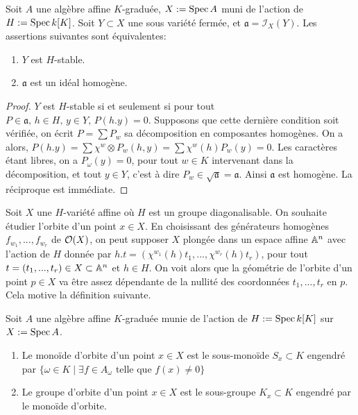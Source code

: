 \begin{prop}\label{stablehomogene}
Soit $A$ une algèbre affine $K$-graduée, $X:=\operatorname{Spec} A$ muni de l'action de $H:=\operatorname{Spec} k[K]$.  Soit $Y\subset X$ une sous variété fermée, et $\mathfrak{a}=\mathcal{I}_X(Y)$. Les assertions suivantes sont équivalentes:
\begin{enumerate}
\item $Y$ est $H$-stable.
\item $\mathfrak{a}$ est un idéal homogène.
\end{enumerate}
\end{prop}
\begin{proof}
$Y$ est $H$-stable si et seulement si pour tout $P\in \mathfrak{a},\,h\in H,\, y\in Y,\, P(h.y)=0$. Supposons que cette dernière condition soit vérifiée, on écrit $P=\sum P_w$ sa décomposition en composantes homogènes. On a alors, $P(h.y)=\sum \chi^w\otimes P_w(h,y) = \sum \chi^w(h) P_w(y)=0$. Les caractères étant libres, on a $P_{\omega}(y)=0$, pour tout $w\in K$ intervenant dans la décomposition, et tout $y\in Y$, c'est à dire $P_w\in \sqrt{\mathfrak{a}}=\mathfrak{a}$. Ainsi $\mathfrak{a}$ est homogène. La réciproque est immédiate. 
\end{proof}

Soit $X$ une $H$-variété affine où $H$ est un groupe diagonalisable. On souhaite étudier l'orbite d'un point $x\in X$. En choisissant des générateurs homogènes $f_{w_1},...,f_{w_r}$ de $\mathcal{O}(X)$, on peut supposer $X$ plongée dans un espace affine $\mathbb{A}^n$ avec l'action de $H$ donnée par $h.t=(\chi^{w_1}(h)t_1,...,\chi^{w_r}(h)t_r)$, pour tout $t=(t_1,...,t_r)\in X\subset \mathbb{A}^n$ et $h\in H$. On voit alors que la géométrie de l'orbite d'un point $p\in X$ va être assez dépendante de la nullité des coordonnées $t_1,..., t_r$ en $p$. Cela motive la définition suivante.

\begin{defn}
Soit $A$ une algèbre affine $K$-graduée munie de l'action de $H:=\operatorname{Spec} k[K]$ sur $X:=\operatorname{Spec} A$.
\begin{enumerate}
\item Le monoïde d'orbite d'un point $x\in X$ est le sous-monoïde $S_x\subset K$ engendré par $\lbrace\omega \in K\mid \exists f\in A_{\omega} \textrm{ telle que } f(x)\neq 0\rbrace$
\item Le groupe d'orbite d'un point $x\in X$ est le sous-groupe $K_x\subset K$ engendré par le monoïde d'orbite.
\end{enumerate}
\end{defn}

